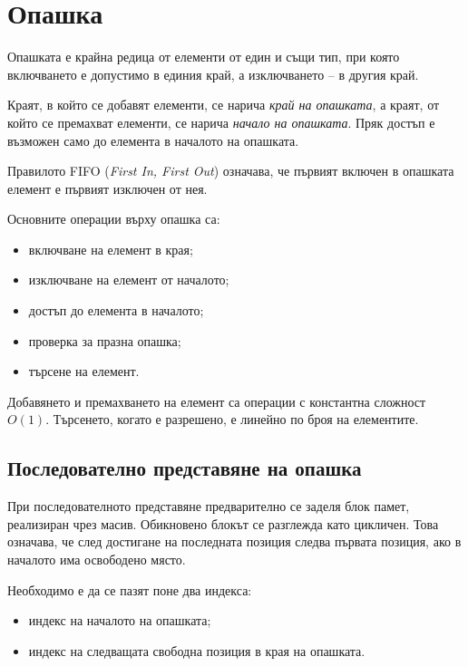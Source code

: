 \section{Опашка}\label{s:18.4}

\begin{defn}[Опашка]
Опашката е крайна редица от елементи от един и същи тип, при която включването е допустимо в единия край, а изключването -- в другия край.
\end{defn}

Краят, в който се добавят елементи, се нарича \emph{край на опашката}, а краят, от който се премахват елементи, се нарича \emph{начало на опашката}. Пряк достъп е възможен само до елемента в началото на опашката.

\begin{keydefn}[FIFO]
Правилото FIFO (\emph{First In, First Out}) означава, че първият включен в опашката елемент е първият изключен от нея.
\end{keydefn}

Основните операции върху опашка са:

\begin{itemize}
    \item включване на елемент в края;
    \item изключване на елемент от началото;
    \item достъп до елемента в началото;
    \item проверка за празна опашка;
    \item търсене на елемент.
\end{itemize}

Добавянето и премахването на елемент са операции с константна сложност $O(1)$. Търсенето, когато е разрешено, е линейно по броя на елементите.

\subsection{Последователно представяне на опашка}\label{s:18.4.1}

При последователното представяне предварително се заделя блок памет, реализиран чрез масив. Обикновено блокът се разглежда като цикличен. Това означава, че след достигане на последната позиция следва първата позиция, ако в началото има освободено място.

Необходимо е да се пазят поне два индекса:

\begin{itemize}
    \item индекс на началото на опашката;
    \item индекс на следващата свободна позиция в края на опашката.
\end{itemize}

